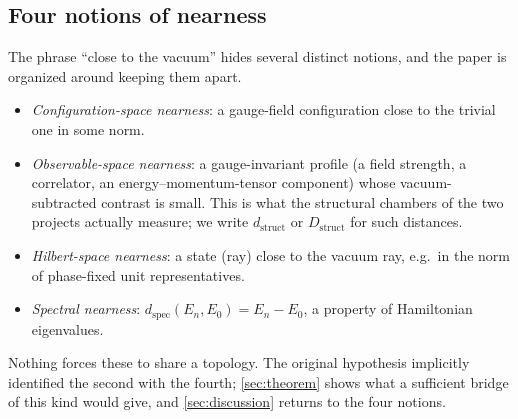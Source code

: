 \documentclass[11pt,a4paper]{article}
\theoremstyle{definition}
\theoremstyle{remark}
\newcommand{\Dstruct}{D_{\mathrm{struct}}}
\newcommand{\dstruct}{d_{\mathrm{struct}}}
\newcommand{\dspec}{d_{\mathrm{spec}}}
\begin{document}
\subsection{Four notions of nearness}
The phrase ``close to the vacuum'' hides several distinct notions, and the paper is organized around keeping them apart.
\begin{itemize}
\item \emph{Configuration-space nearness}: a gauge-field configuration close to the trivial one in some norm.
\item \emph{Observable-space nearness}: a gauge-invariant profile (a field strength, a correlator, an energy--momentum-tensor component) whose vacuum-subtracted contrast is small. This is what the structural chambers of the two projects actually measure; we write $\dstruct$ or $\Dstruct$ for such distances.
\item \emph{Hilbert-space nearness}: a state (ray) close to the vacuum ray, e.g.\ in the norm of phase-fixed unit representatives.
\item \emph{Spectral nearness}: $\dspec(E_n,E_0)=E_n-E_0$, a property of Hamiltonian eigenvalues.
\end{itemize}
Nothing forces these to share a topology. The original hypothesis implicitly identified the second with the fourth; \cref{sec:theorem} shows what a sufficient bridge of this kind would give, and \cref{sec:discussion} returns to the four notions.
\end{document}
